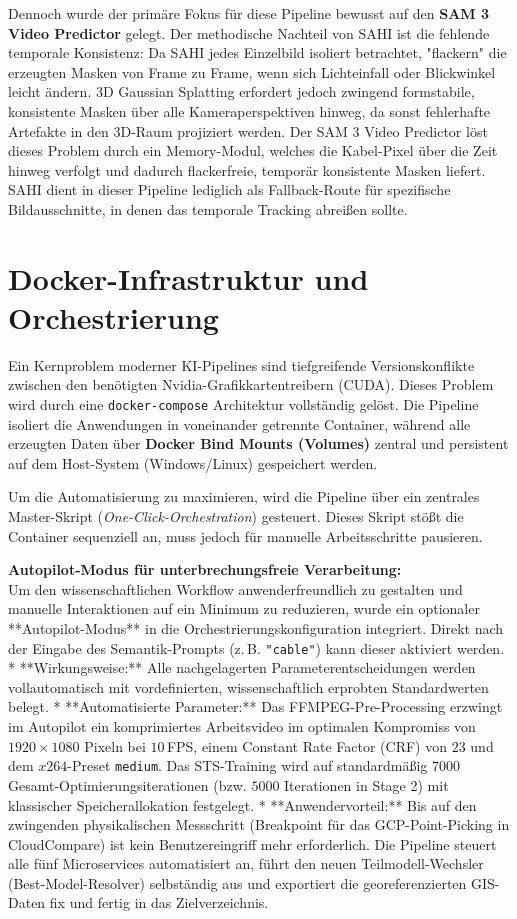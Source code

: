 \documentclass[12pt,a4paper]{article}
\begin{document}
Dennoch wurde der primäre Fokus für diese Pipeline bewusst auf den \textbf{SAM 3 Video Predictor} gelegt. Der methodische Nachteil von SAHI ist die fehlende temporale Konsistenz: Da SAHI jedes Einzelbild isoliert betrachtet, "flackern" die erzeugten Masken von Frame zu Frame, wenn sich Lichteinfall oder Blickwinkel leicht ändern. 3D Gaussian Splatting erfordert jedoch zwingend formstabile, konsistente Masken über alle Kameraperspektiven hinweg, da sonst fehlerhafte Artefakte in den 3D-Raum projiziert werden. Der SAM 3 Video Predictor löst dieses Problem durch ein Memory-Modul, welches die Kabel-Pixel über die Zeit hinweg verfolgt und dadurch flackerfreie, temporär konsistente Masken liefert. SAHI dient in dieser Pipeline lediglich als Fallback-Route für spezifische Bildausschnitte, in denen das temporale Tracking abreißen sollte.


\section{Docker-Infrastruktur und Orchestrierung}
Ein Kernproblem moderner KI-Pipelines sind tiefgreifende Versionskonflikte zwischen den benötigten Nvidia-Grafikkartentreibern (CUDA). Dieses Problem wird durch eine \texttt{docker-compose} Architektur vollständig gelöst. Die Pipeline isoliert die Anwendungen in voneinander getrennte Container, während alle erzeugten Daten über \textbf{Docker Bind Mounts (Volumes)} zentral und persistent auf dem Host-System (Windows/Linux) gespeichert werden.

Um die Automatisierung zu maximieren, wird die Pipeline über ein zentrales Master-Skript (\textit{One-Click-Orchestration}) gesteuert. Dieses Skript stößt die Container sequenziell an, muss jedoch für manuelle Arbeitsschritte pausieren. 

\textbf{Autopilot-Modus für unterbrechungsfreie Verarbeitung:}\\
Um den wissenschaftlichen Workflow anwenderfreundlich zu gestalten und manuelle Interaktionen auf ein Minimum zu reduzieren, wurde ein optionaler **Autopilot-Modus** in die Orchestrierungskonfiguration integriert. Direkt nach der Eingabe des Semantik-Prompts (z.\,B. \texttt{"cable"}) kann dieser aktiviert werden. 
*   **Wirkungsweise:** Alle nachgelagerten Parameterentscheidungen werden vollautomatisch mit vordefinierten, wissenschaftlich erprobten Standardwerten belegt. 
*   **Automatisierte Parameter:** Das FFMPEG-Pre-Processing erzwingt im Autopilot ein komprimiertes Arbeitsvideo im optimalen Kompromiss von $1920 \times 1080$ Pixeln bei $10$\,FPS, einem Constant Rate Factor (CRF) von $23$ und dem $x264$-Preset \texttt{medium}. Das STS-Training wird auf standardmäßig $7000$ Gesamt-Optimierungsiterationen (bzw. $5000$ Iterationen in Stage 2) mit klassischer Speicherallokation festgelegt.
*   **Anwendervorteil:** Bis auf den zwingenden physikalischen Messschritt (Breakpoint für das GCP-Point-Picking in CloudCompare) ist kein Benutzereingriff mehr erforderlich. Die Pipeline steuert alle fünf Microservices automatisiert an, führt den neuen Teilmodell-Wechsler (Best-Model-Resolver) selbständig aus und exportiert die georeferenzierten GIS-Daten fix und fertig in das Zielverzeichnis.
\end{document}
